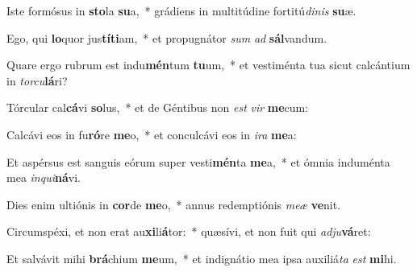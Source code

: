 \item Iste formósus in \textbf{sto}la \textbf{su}a,~* grádiens in multitúdine fortitú\textit{di}\textit{nis} \textbf{su}æ.
\item Ego, qui \textbf{lo}quor jus\textbf{tí}\textbf{ti}am,~* et propugnátor \textit{sum} \textit{ad} \textbf{sál}vandum.
\item Quare ergo rubrum est indu\textbf{mén}tum \textbf{tu}um,~* et vestiménta tua sicut calcántium in \textit{tor}\textit{cu}\textbf{lá}ri?
\item Tórcular cal\textbf{cá}vi \textbf{so}lus,~* et de Géntibus non \textit{est} \textit{vir} \textbf{me}cum:
\item Calcávi eos in fu\textbf{ró}re \textbf{me}o,~* et conculcávi eos in \textit{i}\textit{ra} \textbf{me}a:
\item Et aspérsus est sanguis eórum super vesti\textbf{mén}ta \textbf{me}a,~* et ómnia induménta mea \textit{in}\textit{qui}\textbf{ná}vi.
\item Dies enim ultiónis in \textbf{cor}de \textbf{me}o,~* annus redemptiónis \textit{me}\textit{æ} \textbf{ve}nit.
\item Circumspéxi, et non erat au\textbf{xi}li\textbf{á}tor:~* quæsívi, et non fuit qui \textit{ad}\textit{ju}\textbf{vá}ret:
\item Et salvávit mihi \textbf{brá}chium \textbf{me}um,~* et indignátio mea ipsa auxiliá\textit{ta} \textit{est} \textbf{mi}hi.
